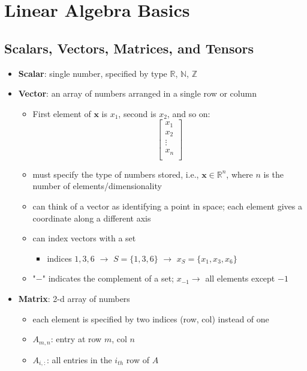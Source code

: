 \section{Linear Algebra Basics}
\subsection{Scalars, Vectors, Matrices, and Tensors}
\begin{itemize}
    \item \textbf{Scalar}: single number, specified by type $\mathbb{R}$, $\mathbb{N}$, $\mathbb{Z}$
    \item \textbf{Vector}: an array of numbers arranged in a single row or column 
    \begin{itemize}
        \item First element of $\mathbf{x}$ is $x_1$, second is $x_2$, and so on:
        $$\begin{bmatrix}
            x_1 \\
            x_2 \\
            \vdots \\
            x_n \\
        \end{bmatrix}$$
        \item must specify the type of numbers stored, i.e., $\mathbf{x} \in \mathbb{R}^n$, where $n$ is the number of elements/dimensionality
        \item can think of a vector as identifying a point in space; each element gives a coordinate along a different axis
        \item can index vectors with a set
        \begin{itemize}
            \item indices $1, 3, 6$ $\rightarrow$ $S = \{1, 3, 6\}$ $\rightarrow$ $x_S = \{x_1, x_3, x_6\}$
        \end{itemize}
        \item "$-$" indicates the complement of a set; $x_{-1} \rightarrow$ all elements except $-1$
    \end{itemize}
    \item \textbf{Matrix}: 2-d array of numbers
    \begin{itemize}
        \item each element is specified by two indices (row, col) instead of one
        \item $A_{m,n}$: entry at row $m$, col $n$
        \item $A_{i, :}$: all entries in the $i_{th}$ row of $A$

\end{itemize}
\end{itemize}
